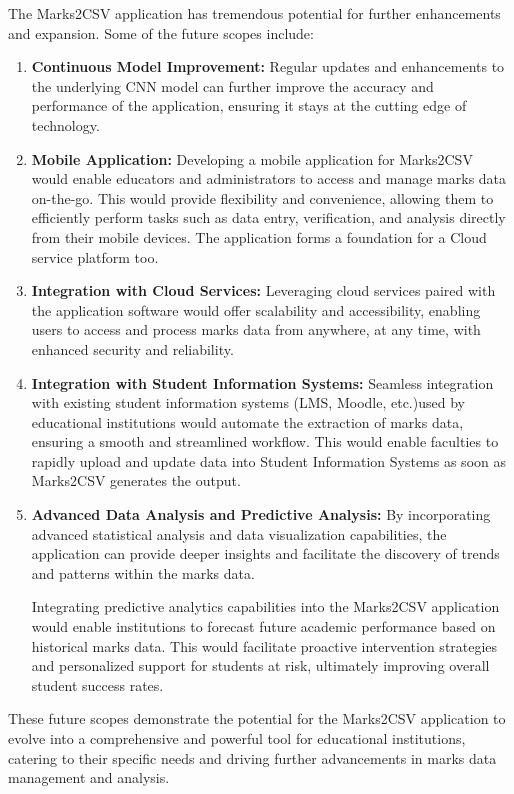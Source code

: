 The Marks2CSV application has tremendous potential for further enhancements and expansion. Some of the future scopes include:
\begin{enumerate}

\item \textbf{Continuous Model Improvement:}  Regular updates and enhancements to the underlying CNN model can further improve the accuracy and performance of the application, ensuring it stays at the cutting edge of technology.

\item \textbf{Mobile Application:}  Developing a mobile application for Marks2CSV would enable educators and administrators to access and manage marks data on-the-go. This would provide flexibility and convenience, allowing them to efficiently perform tasks such as data entry, verification, and analysis directly from their mobile devices. The application forms a foundation for a Cloud service platform too. 

\item \textbf{Integration with Cloud Services:} Leveraging cloud services paired with the application software would offer scalability and accessibility, enabling users to access and process marks data from anywhere, at any time, with enhanced security and reliability. 

\item \textbf{Integration with Student Information Systems:} Seamless integration with existing student information systems (LMS, Moodle, etc.)used by educational institutions would automate the extraction of marks data, ensuring a smooth and streamlined workflow. This would enable faculties to rapidly upload and update data into Student Information Systems  as soon as Marks2CSV generates the output.

\item \textbf{Advanced Data Analysis and Predictive Analysis:} By incorporating advanced statistical analysis and data visualization capabilities, the application can provide deeper insights and facilitate the discovery of trends and patterns within the marks data. 

Integrating predictive analytics capabilities into the Marks2CSV application would enable institutions to forecast future academic performance based on historical marks data. This would facilitate proactive intervention strategies and personalized support for students at risk, ultimately improving overall student success rates.

\end{enumerate}
These future scopes demonstrate the potential for the Marks2CSV application to evolve into a comprehensive and powerful tool for educational institutions, catering to their specific needs and driving further advancements in marks data management and analysis.

